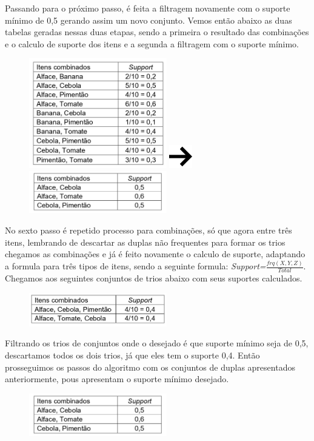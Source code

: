 \documentclass[tcc1]{uftex}
\begin{document}
Passando para o próximo passo, é feita a filtragem novamente com o suporte mínimo de 0,5 gerando assim um novo conjunto. Vemos então abaixo as duas tabelas geradas nessas duas etapas, sendo a primeira o resultado das combinações e o calculo de suporte dos itens e a segunda a filtragem com o suporte mínimo.
    \begin{figure}[!h]
    \centering
    \includegraphics[width=6cm]{passo_3.jpg}
    \includegraphics[width=1cm]{seta.png}
    \includegraphics[width=6cm]{passo_4.jpg}
    \end{figure}

No sexto passo é repetido processo para combinações, só que agora entre três itens, lembrando de descartar as duplas não frequentes para formar os trios chegamos as combinações e já é feito novamente o calculo de suporte, adaptando a formula para três tipos de itens, sendo a seguinte formula:  \textit{Support=}${\frac{frq(X,Y,Z)}{Total}}$. Chegamos aos seguintes conjuntos de trios abaixo com seus suportes calculados.
    \begin{figure}[!h]
    \centering
    \includegraphics[width=6cm]{passo_5.jpg}
    \end{figure}

Filtrando os trios de conjuntos onde o desejado é que suporte mínimo seja de 0,5, descartamos todos os dois trios, já que eles tem o suporte 0,4. Então prosseguimos os passos do algoritmo com os conjuntos de duplas apresentados anteriormente, pous apresentam o suporte mínimo desejado.
    \begin{figure}[!h]
    \centering
    \includegraphics[width=6cm]{passo_4.jpg}
    \end{figure}
\end{document}
